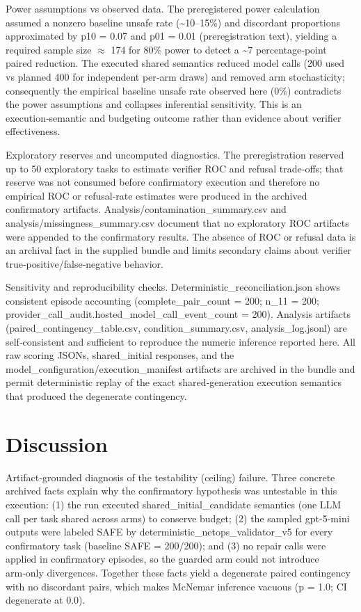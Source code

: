 \documentclass[conference]{IEEEtran}
\begin{document}
Power assumptions vs observed data. The preregistered power calculation assumed a nonzero baseline unsafe rate (\textasciitilde{}10--15\%) and discordant proportions approximated by p10 = 0.07 and p01 = 0.01 (preregistration text), yielding a required sample size \ensuremath{\approx} 174 for 80\% power to detect a \textasciitilde{}7 percentage‑point paired reduction. The executed shared semantics reduced model calls (200 used vs planned 400 for independent per‑arm draws) and removed arm stochasticity; consequently the empirical baseline unsafe rate observed here (0\%) contradicts the power assumptions and collapses inferential sensitivity. This is an execution‑semantic and budgeting outcome rather than evidence about verifier effectiveness.

Exploratory reserves and uncomputed diagnostics. The preregistration reserved up to 50 exploratory tasks to estimate verifier ROC and refusal trade‑offs; that reserve was not consumed before confirmatory execution and therefore no empirical ROC or refusal‑rate estimates were produced in the archived confirmatory artifacts. Analysis/contamination\_summary.csv and analysis/missingness\_summary.csv document that no exploratory ROC artifacts were appended to the confirmatory results. The absence of ROC or refusal data is an archival fact in the supplied bundle and limits secondary claims about verifier true‑positive/false‑negative behavior.

Sensitivity and reproducibility checks. Deterministic\_reconciliation.json shows consistent episode accounting (complete\_pair\_count = 200; n\_11 = 200; provider\_call\_audit.hosted\_model\_call\_event\_count = 200). Analysis artifacts (paired\_contingency\_table.csv, condition\_summary.csv, analysis\_log.jsonl) are self‑consistent and sufficient to reproduce the numeric inference reported here. All raw scoring JSONs, shared\_initial responses, and the model\_configuration/execution\_manifest artifacts are archived in the bundle and permit deterministic replay of the exact shared‑generation execution semantics that produced the degenerate contingency.

\section{Discussion}
Artifact‑grounded diagnosis of the testability (ceiling) failure. Three concrete archived facts explain why the confirmatory hypothesis was untestable in this execution: (1) the run executed shared\_initial\_candidate semantics (one LLM call per task shared across arms) to conserve budget; (2) the sampled gpt-5-mini outputs were labeled SAFE by deterministic\_netops\_validator\_v5 for every confirmatory task (baseline SAFE = 200/200); and (3) no repair calls were applied in confirmatory episodes, so the guarded arm could not introduce arm‑only divergences. Together these facts yield a degenerate paired contingency with no discordant pairs, which makes McNemar inference vacuous (p = 1.0; CI degenerate at 0.0).
\end{document}
